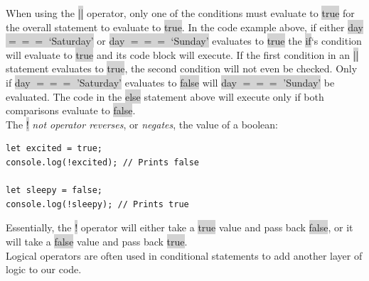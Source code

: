 \documentclass[11pt]{article}
\begin{document}
When using the \colorbox{lightgray}{||} operator, only one of the conditions must evaluate to \colorbox{lightgray}{true} for the overall statement to evaluate to \colorbox{lightgray}{true}. In the code example above, if either \colorbox{lightgray}{day $=$$=$$=$ `Saturday'} or \colorbox{lightgray}{day $=$$=$$=$ `Sunday'} evaluates to \colorbox{lightgray}{true} the \colorbox{lightgray}{if}‘s condition will evaluate to \colorbox{lightgray}{true} and its code block will execute. If the first condition in an \colorbox{lightgray}{||} statement evaluates to \colorbox{lightgray}{true}, the second condition will not even be checked. Only if \colorbox{lightgray}{day $=$$=$$=$ 'Saturday'} evaluates to \colorbox{lightgray}{false} will \colorbox{lightgray}{day $=$$=$$=$ 'Sunday'} be evaluated. The code in the \colorbox{lightgray}{else} statement above will execute only if both comparisons evaluate to \colorbox{lightgray}{false}. \\
\newline
The \colorbox{lightgray}{!} \textit{not operator reverses}, or \textit{negates}, the value of a boolean:
\begin{lstlisting}
let excited = true;
console.log(!excited); // Prints false

let sleepy = false;
console.log(!sleepy); // Prints true
\end{lstlisting}
Essentially, the \colorbox{lightgray}{!} operator will either take a \colorbox{lightgray}{true} value and pass back \colorbox{lightgray}{false}, or it will take a \colorbox{lightgray}{false} value and pass back \colorbox{lightgray}{true}. \\
\newline
Logical operators are often used in conditional statements to add another layer of logic to our code.
\end{document}
